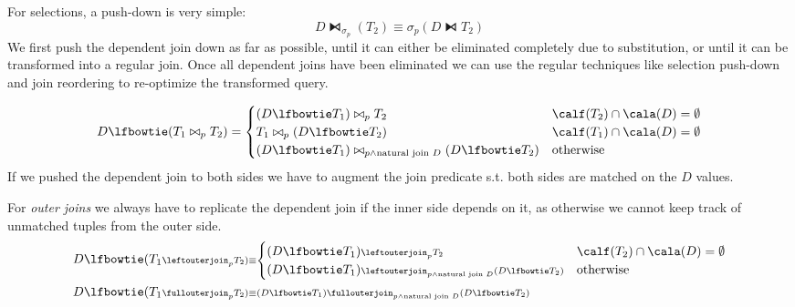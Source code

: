 \documentclass[11pt]{article}
\begin{document}
For selections, a push-down is very simple:
\begin{equation*}
D\lfbowtie_{\sigma_p}(T_2)\equiv\sigma_p(D\lfbowtie T_2)
\end{equation*}
We first push the dependent join down as far as possible, until it can either be eliminated completely
due to substitution, or until it can be transformed into a regular join. Once all dependent joins have
been eliminated we can use the regular techniques like selection push-down and join reordering to
re-optimize the transformed query.

\begin{equation*}
D\lfbowtie(T_1\bowtie_pT_2)=
\begin{cases}
(D\lfbowtie T_1)\bowtie_pT_2&\calf(T_2)\cap\cala(D)=\emptyset\\
T_1\bowtie_p(D\lfbowtie T_2)&\calf(T_1)\cap\cala(D)=\emptyset\\
(D\lfbowtie T_1)\bowtie_{p\wedge\text{natural join }D}(D\lfbowtie T_2)&\text{otherwise}
\end{cases}
\end{equation*}
If we pushed the dependent join to both sides we have to augment the join predicate s.t. both sides
are matched on the \(D\) values.

For \emph{outer joins} we always have to replicate the dependent join if the inner side depends on it, as
otherwise we cannot keep track of unmatched tuples from the outer side.
\begin{align*}
&D\lfbowtie(T_1\scriptstyle\leftouterjoin_pT_2)\equiv
\begin{cases}
(D\lfbowtie T_1)\scriptstyle\leftouterjoin_pT_2&\calf(T_2)\cap\cala(D)=\emptyset\\
(D\lfbowtie T_1)\scriptstyle\leftouterjoin_{p\wedge\text{natural join }D}(D\lfbowtie T_2)&\text{otherwise}\\
\end{cases}\\
&D\lfbowtie(T_1\scriptstyle\fullouterjoin_pT_2)\equiv(D\lfbowtie T_1)\scriptstyle\fullouterjoin_{p\wedge\text{natural join }D}(D\lfbowtie T_2)
\end{align*}
\end{document}
